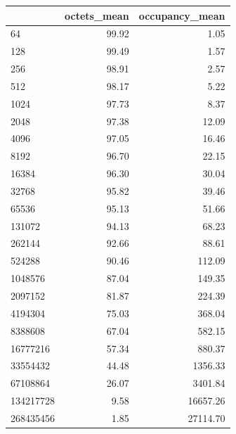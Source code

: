 \begin{tabular}{lrr}
\toprule
 & octets_mean & occupancy_mean \\
\midrule
64 & 99.92 & 1.05 \\
128 & 99.49 & 1.57 \\
256 & 98.91 & 2.57 \\
512 & 98.17 & 5.22 \\
1024 & 97.73 & 8.37 \\
2048 & 97.38 & 12.09 \\
4096 & 97.05 & 16.46 \\
8192 & 96.70 & 22.15 \\
16384 & 96.30 & 30.04 \\
32768 & 95.82 & 39.46 \\
65536 & 95.13 & 51.66 \\
131072 & 94.13 & 68.23 \\
262144 & 92.66 & 88.61 \\
524288 & 90.46 & 112.09 \\
1048576 & 87.04 & 149.35 \\
2097152 & 81.87 & 224.39 \\
4194304 & 75.03 & 368.04 \\
8388608 & 67.04 & 582.15 \\
16777216 & 57.34 & 880.37 \\
33554432 & 44.48 & 1356.33 \\
67108864 & 26.07 & 3401.84 \\
134217728 & 9.58 & 16657.26 \\
268435456 & 1.85 & 27114.70 \\
\bottomrule
\end{tabular}
